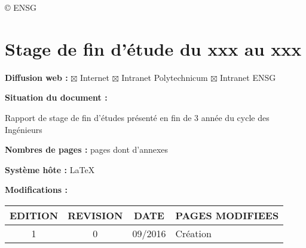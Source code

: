 \vspace{1cm}

\copyright \hspace{0.3cm} ENSG

\section*{Stage de fin d'étude du xxx au xxx }
\vspace{0.3cm}
\textbf{Diffusion web :} $\boxtimes$ Internet \hspace{0.2cm}$\boxtimes$ Intranet Polytechnicum\hspace{0.2cm}
$\boxtimes$ Intranet ENSG\vspace{0.3cm}

\textbf{Situation du document :} 
\vspace{0.2cm}
\par
Rapport de stage de fin d'études présenté en fin de 3 année du cycle des Ingénieurs
\vspace{0.3cm}



\textbf{Nombres de pages :}  pages dont  d'annexes
\vspace{0.3cm}

\textbf{Système hôte :} \LaTeX
\vspace{1cm}


\textbf{Modifications :} 
\begin{center}
\begin{tabular}{|c|c|c|>{\centering}p{6.5cm}|}
\hline 
EDITION & REVISION & DATE & PAGES MODIFIEES\tabularnewline
\hline
\hline 
1 & 0 & 09/2016 & Création\tabularnewline
\hline 

\end{tabular}
\end{center}